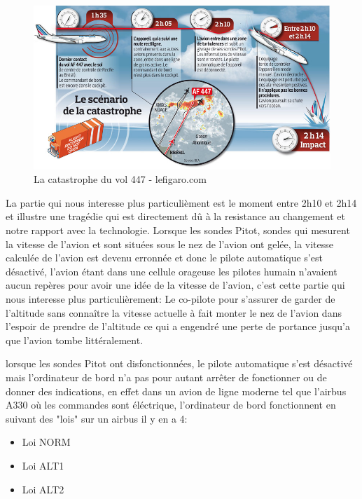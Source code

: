         \begin{figure}[H]
            \centering
            \includegraphics[width=1\textwidth]{Images/447}
            \caption{La catastrophe du vol 447 - lefigaro.com}
            \label{fig:447airfrance}
        \end{figure}

        La partie qui nous interesse plus particulièment est le moment entre 2h10 et 2h14 et illustre 
        une tragédie qui est directement dû à la resistance au changement et notre rapport avec la 
        technologie. \newline 
        Lorsque les sondes Pitot, sondes qui mesurent la vitesse de l'avion et sont situées sous
        le nez de l'avion ont gelée, la vitesse calculée de l'avion est devenu erronnée
        et donc le pilote automatique s'est désactivé, l'avion étant dans une cellule orageuse 
        les pilotes humain n'avaient aucun repères pour avoir une idée de la vitesse de l'avion,
        c'est cette partie qui nous interesse plus particulièrement: 
        Le co-pilote pour s'assurer de garder de l'altitude sans connaître la vitesse actuelle 
        à fait monter le nez de l'avion dans l'espoir de prendre de l'altitude ce qui a engendré 
        une perte de portance jusqu'a que l'avion tombe littéralement. 
        \newline 

        lorsque les sondes Pitot ont disfonctionnées, le pilote automatique s'est désactivé 
        mais l'ordinateur de bord n'a pas pour autant arrêter de fonctionner ou de donner 
        des indications, en effet dans un avion de ligne moderne tel que l'airbus A330
        où les commandes sont éléctrique, l'ordinateur de bord fonctionnent en suivant 
        des "lois" sur un airbus il y en a 4: 
        
        \begin{itemize}
            \item Loi NORM
            \item Loi ALT1
            \item Loi ALT2 
        \end{itemize}

